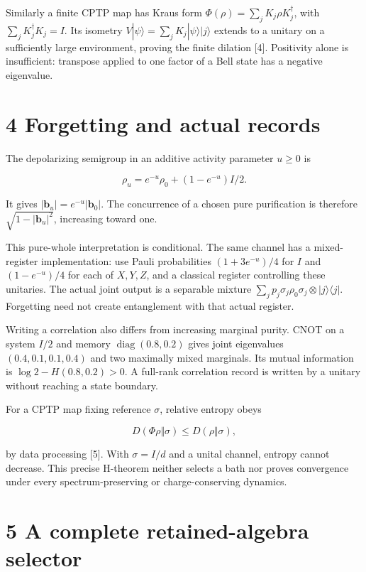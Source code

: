 \documentclass[
  11pt,
  a4paper,
]{article}
\begin{document}
Similarly a finite CPTP map has Kraus form \(\Phi(\rho)=\sum_jK_j\rho K_j^\dagger\), with \(\sum_jK_j^\dagger K_j=I\). Its isometry \(V|\psi\rangle=\sum_jK_j|\psi\rangle|j\rangle\) extends to a unitary on a sufficiently large environment, proving the finite dilation {[}4{]}. Positivity alone is insufficient: transpose applied to one factor of a Bell state has a negative eigenvalue.

\section{4 Forgetting and actual records}\label{forgetting-and-actual-records}

The depolarizing semigroup in an additive activity parameter \(u\ge0\) is

\[\rho_u=e^{-u}\rho_0+(1-e^{-u})I/2.\]

It gives \(|\mathbf b_u|=e^{-u}|\mathbf b_0|\). The concurrence of a chosen pure purification is therefore \(\sqrt{1-|\mathbf b_u|^2}\), increasing toward one.

This pure-whole interpretation is conditional. The same channel has a mixed-register implementation: use Pauli probabilities \((1+3e^{-u})/4\) for \(I\) and \((1-e^{-u})/4\) for each of \(X,Y,Z\), and a classical register controlling these unitaries. The actual joint output is a separable mixture \(\sum_jp_j\sigma_j\rho_0\sigma_j\otimes|j\rangle\langle j|\). Forgetting need not create entanglement with that actual register.

Writing a correlation also differs from increasing marginal purity. CNOT on a system \(I/2\) and memory \(\operatorname{diag}(0.8,0.2)\) gives joint eigenvalues \((0.4,0.1,0.1,0.4)\) and two maximally mixed marginals. Its mutual information is \(\log2-H(0.8,0.2)>0\). A full-rank correlation record is written by a unitary without reaching a state boundary.

For a CPTP map fixing reference \(\sigma\), relative entropy obeys

\[D(\Phi\rho\Vert\sigma)\le D(\rho\Vert\sigma),\]

by data processing {[}5{]}. With \(\sigma=I/d\) and a unital channel, entropy cannot decrease. This precise H-theorem neither selects a bath nor proves convergence under every spectrum-preserving or charge-conserving dynamics.

\section{5 A complete retained-algebra selector}\label{a-complete-retained-algebra-selector}
\end{document}
